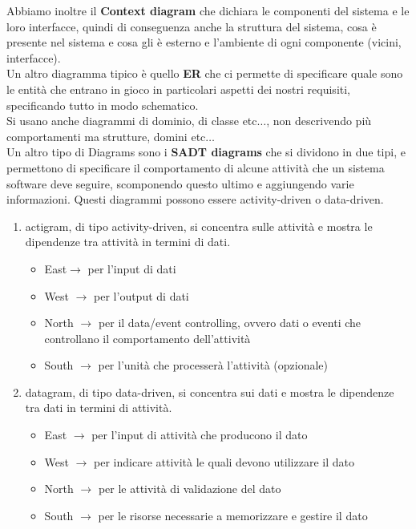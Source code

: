 Abbiamo inoltre il \textbf{Context diagram} che dichiara le componenti del sistema e le loro interfacce, quindi di conseguenza anche la struttura del sistema, cosa è presente nel sistema e cosa gli è esterno e l’ambiente di ogni componente (vicini, interfacce).\\

Un altro diagramma tipico è quello \textbf{ER} che ci permette di specificare quale sono le entità che entrano in gioco in particolari aspetti dei nostri requisiti, specificando tutto in modo schematico.\\
Si usano anche diagrammi di dominio, di classe etc$\ldots$, non descrivendo più comportamenti ma strutture, domini etc$\ldots$\\

Un altro tipo di Diagrams sono i \textbf{SADT diagrams} che si dividono in due tipi, e permettono di specificare il comportamento di alcune attività che un sistema software deve seguire, scomponendo questo ultimo e aggiungendo varie informazioni. Questi diagrammi possono essere activity-driven o data-driven.
\begin{enumerate}
    \item actigram, di tipo activity-driven, si concentra sulle attività e mostra le dipendenze tra attività in termini di dati. 
        \begin{itemize}
            \item East$\longrightarrow$ per l'input di dati
            \item West $\longrightarrow$ per l'output di dati
            \item North $\longrightarrow$ per il data/event controlling, ovvero dati o eventi che controllano il comportamento dell'attività
            \item South $\longrightarrow$ per l'unità che processerà l'attività (opzionale)
        \end{itemize}
    \item datagram, di tipo data-driven, si concentra sui dati e mostra le dipendenze tra dati in termini di attività.
        \begin{itemize}
            \item East $\longrightarrow$ per l'input di attività che producono il dato
            \item West $\longrightarrow$ per indicare attività le quali devono utilizzare il dato
            \item North $\longrightarrow$ per le attività di validazione del dato
            \item South $\longrightarrow$ per le risorse necessarie a memorizzare e gestire il dato
        \end{itemize}
\end{enumerate}
